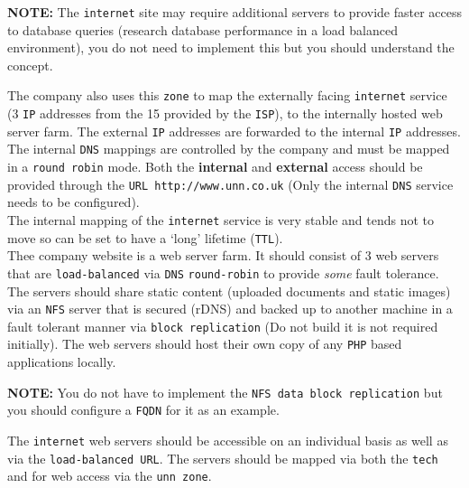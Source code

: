\documentclass[11pt]{article}
\begin{document}
\begin{tcolorbox}[colback=blue!20]
\textbf{NOTE:} The \texttt{internet} site may require additional servers to provide faster access to database queries (research database performance in 
a load balanced environment), you do not need to implement this but you should understand the concept.
\end{tcolorbox}

\noindent The company also uses this \texttt{zone} to map the externally facing \texttt{internet} service (3 \texttt{IP} addresses from the 15 provided by the \texttt{ISP}), 
to the internally hosted web server farm.  The external \texttt{IP} addresses are forwarded to the internal \texttt{IP} addresses. The internal \texttt{DNS} 
mappings are controlled by the company and must be mapped in a \texttt{round robin} mode. Both the \textbf{internal} and \textbf{external} access should 
be provided through the \texttt{URL http://www.unn.co.uk} (Only the internal \texttt{DNS} service needs to be configured).\\

\noindent The internal mapping of the \texttt{internet} service is very stable and tends not to move so can be set to have a ‘long’ lifetime (\texttt{TTL}).\\

\noindent Thee company website is a web server farm. It should consist of 3 web servers that are \texttt{load-balanced} via \texttt{DNS} \texttt{round-robin} 
to provide \textit{some} fault tolerance. The servers should share static content (uploaded documents and static images) via an \texttt{NFS} server that is 
secured (rDNS) and backed up to another machine in a fault tolerant manner via \texttt{block replication} (Do not build it is not required initially). The 
web servers should host their own copy of any \texttt{PHP} based applications locally.\\ 

\begin{tcolorbox}[colback=blue!20]
    \textbf{NOTE:} You do not have to implement the \texttt{NFS data block replication} but you should configure a \texttt{FQDN} for it as an example.
\end{tcolorbox}

\noindent The \texttt{internet} web servers should be accessible on an individual basis as well as via the \texttt{load-balanced URL}. The servers should 
be mapped via both the \texttt{tech} and for web access via the \texttt{unn zone}.\\
\end{document}
